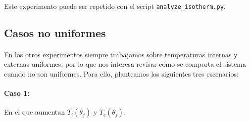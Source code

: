 \documentclass[12pt]{article}
\begin{document}
\paragraph{} Este experimento puede ser repetido con el script \texttt{analyze\_isotherm.py}.




\subsection{Casos no uniformes}

\paragraph{} En los otros experimentos siempre trabajamos sobre temperaturas internas y externas uniformes, por lo que nos interesa revisar cómo se comporta el sistema cuando no son uniformes. Para ello, planteamos los siguientes tres escenarios:

\paragraph{Caso 1:} En el que aumentan \(T_i(\theta_j)\) y \(T_e(\theta_j)\).
\end{document}
